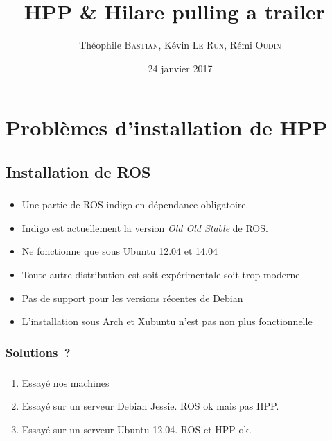 \documentclass[11pt]{beamer}
\author{Théophile \textsc{Bastian}, Kévin \textsc{Le Run}, Rémi \textsc{Oudin}}
\title{HPP \& \og{}Hilare pulling a trailer~\fg}
\date{24 janvier 2017}
\begin{document}
\begin{frame}
	\titlepage{}
	\tableofcontents
\end{frame}



\section{Problèmes d'installation de HPP}

\subsection{Installation de ROS}

\begin{frame}
    \frametitle{\subsecname}
    \begin{itemize}
        \item Une partie de ROS indigo en dépendance obligatoire.
        \item Indigo est actuellement la version \emph{Old Old Stable} de ROS\@.
        \item Ne fonctionne que sous Ubuntu 12.04 et 14.04
        \item Toute autre distribution est soit expérimentale soit trop moderne
        \item Pas de support pour les versions récentes de Debian
        \item L'installation sous Arch et Xubuntu n'est pas non plus
            fonctionnelle
    \end{itemize}
\end{frame}

\subsubsection{Solutions~?}

\begin{frame}
    \frametitle{\subsecname}
    \begin{enumerate}
        \item Essayé nos machines
        \item Essayé sur un serveur Debian Jessie. ROS ok mais pas HPP\@.
        \item Essayé sur un serveur Ubuntu 12.04. ROS et HPP ok.
    \end{enumerate}
\end{frame}
\end{document}
